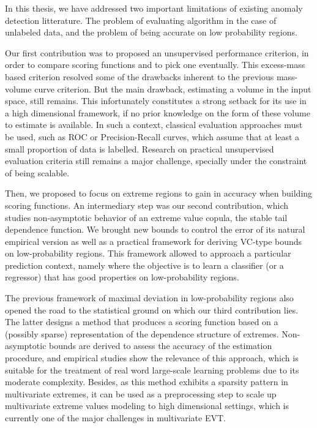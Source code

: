 In this thesis, we have addressed two important limitations of existing anomaly detection litterature. The problem of evaluating algorithm in the case of unlabeled data, and the problem of being accurate on low probability regions.

Our first contribution was to proposed an unsupervised performance criterion, in order to compare scoring functions and to pick one eventually.
%
This excess-mass based criterion resolved some of the drawbacks inherent to the previous mass-volume curve criterion. But the main drawback, estimating a volume in the input space, still remains. This infortunately constitutes a strong setback for its use in a high dimensional framework, if no prior knowledge on the form of these volume to estimate is available. In such a context, classical evaluation approaches must be used, such as ROC or Precision-Recall curves, which assume that at least a small proportion of data is labelled.
Research on practical unsupervised evaluation criteria still remains a major challenge, specially under the constraint of being scalable. 

Then, we proposed to focus on extreme regions to gain in accuracy when building scoring functions. An intermediary step was our second contribution, which studies non-asymptotic behavior of an extreme value copula, the stable tail dependence function. We brought new bounds to control the error of its natural empirical version as well as a practical framework for deriving VC-type bounds on low-probability regions.
%
This framework allowed to approach a particular prediction context, namely where
the objective is to learn a classifier (or a regressor) that has good properties on
low-probability regions.


The previous framework of maximal deviation in low-probability regions also opened the road to the statistical ground on which our third contribution lies. The latter designs a method that produces a scoring function based on a (possibly sparse) representation of the dependence structure of extremes. Non-asymptotic bounds are derived to assess the accuracy of the estimation procedure, and empirical studies show the relevance of this approach, which is suitable for the treatment of real word large-scale learning problems due to its moderate complexity.
%
Besides, as this method exhibits a sparsity pattern in multivariate extremes, it can be used as a preprocessing step to scale up multivariate extreme values modeling to high dimensional settings, which is currently one of the major challenges in multivariate EVT.


